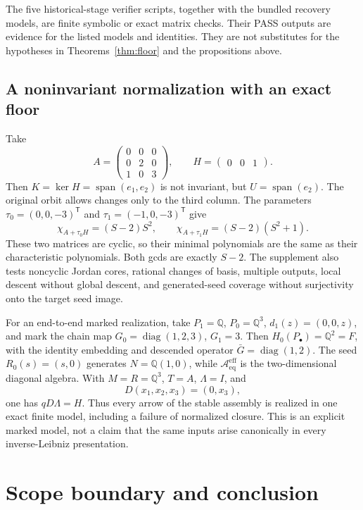 \documentclass[11pt]{amsart}
\theoremstyle{definition}
\newcommand{\Q}{\mathbb Q}
\newcommand{\Aeff}{\mathscr A_{\mathrm{eq}}^{\mathrm{eff}}}
\begin{document}
The five historical-stage verifier scripts, together with the bundled recovery
models, are finite symbolic or exact matrix checks. Their PASS outputs are evidence
for the listed models and identities. They are not substitutes for the hypotheses in
Theorems~\ref{thm:floor} and the propositions above.


\subsection{A noninvariant normalization with an exact floor}
Take
\[
A=\begin{pmatrix}0&0&0\\0&2&0\\1&0&3\end{pmatrix},
\qquad H=\begin{pmatrix}0&0&1\end{pmatrix}.
\]
Then \(K=\ker H=\operatorname{span}(e_1,e_2)\) is not invariant, but
\(U=\operatorname{span}(e_2)\). The original orbit allows changes only to the third column.
The parameters \(\tau_0=(0,0,-3)^{\mathsf T}\) and
\(\tau_1=(-1,0,-3)^{\mathsf T}\) give
\[
\chi_{A+\tau_0H}=(S-2)S^2,\qquad
\chi_{A+\tau_1H}=(S-2)(S^2+1).
\]
These two matrices are cyclic, so their minimal polynomials are the same as
their characteristic polynomials. Both gcds are exactly \(S-2\).
The supplement also tests noncyclic Jordan cores, rational changes of basis,
multiple outputs, local descent without global descent, and generated-seed
coverage without surjectivity onto the target seed image.

For an end-to-end marked realization, take
\(P_1=\Q\), \(P_0=\Q^3\), \(d_1(z)=(0,0,z)\), and mark the chain map
\(G_0=\operatorname{diag}(1,2,3)\), \(G_1=3\).
Then \(H_0(P_\bullet)=\Q^2=F\), with the identity embedding and descended
operator \(\bar G=\operatorname{diag}(1,2)\).
The seed \(R_0(s)=(s,0)\) generates \(N=\Q(1,0)\), while
\(\Aeff\) is the two-dimensional diagonal algebra.
With \(M=R=\Q^3\),
\(T=A\), \(\Lambda=I\), and
\[
D(x_1,x_2,x_3)=(0,x_3),
\]
one has \(qD\Lambda=H\). Thus every arrow of the stable assembly is realized
in one exact finite model, including a failure of normalized closure.
This is an explicit marked model, not a claim that the same inputs arise
canonically in every inverse-Leibniz presentation.

\section{Scope boundary and conclusion}
\end{document}

